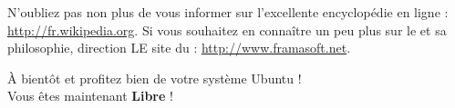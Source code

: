 N'oubliez pas non plus de vous informer sur l'excellente encyclopédie  en ligne : \url{http://fr.wikipedia.org}. Si vous souhaitez en connaître un peu plus sur le  et sa philosophie, direction LE site du  : \url{http://www.framasoft.net}.\par
{}
\begin{center}
À bientôt et profitez bien de votre système Ubuntu !\\Vous êtes maintenant \textbf{Libre} !\par
\end{center}

